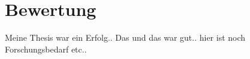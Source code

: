 \chapter{Bewertung}

Meine Thesis war ein Erfolg.. 
Das und das war gut.. hier ist noch Forschungsbedarf etc..
